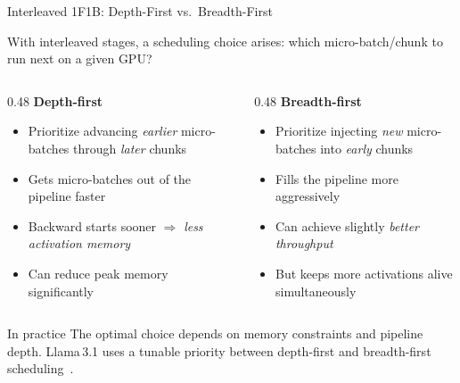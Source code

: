 \begin{frame}{Interleaved 1F1B: Depth-First vs.\ Breadth-First}

  With interleaved stages, a scheduling choice arises: which micro-batch/chunk to run next on a given GPU?

  \vspace{0.5em}
  \begin{columns}
    \begin{column}{0.48\textwidth}
      \textbf{Depth-first}~\cite{lamy2023breadthfirst}
      \begin{itemize}
        \item Prioritize advancing \emph{earlier} micro-batches through \emph{later} chunks
        \item Gets micro-batches out of the pipeline faster
        \item Backward starts sooner $\Rightarrow$ \emph{less activation memory}
        \item Can reduce peak memory significantly
      \end{itemize}
    \end{column}
    \begin{column}{0.48\textwidth}
      \textbf{Breadth-first}~\cite{lamy2023breadthfirst}
      \begin{itemize}
        \item Prioritize injecting \emph{new} micro-batches into \emph{early} chunks
        \item Fills the pipeline more aggressively
        \item Can achieve slightly \emph{better throughput}
        \item But keeps more activations alive simultaneously
      \end{itemize}
    \end{column}
  \end{columns}

  \vspace{0.5em}
  \begin{alertblock}{In practice}
    The optimal choice depends on memory constraints and pipeline depth. Llama\,3.1 uses a tunable priority between depth-first and breadth-first scheduling~\cite{grattafiori2024llama3}.
  \end{alertblock}
\end{frame}

